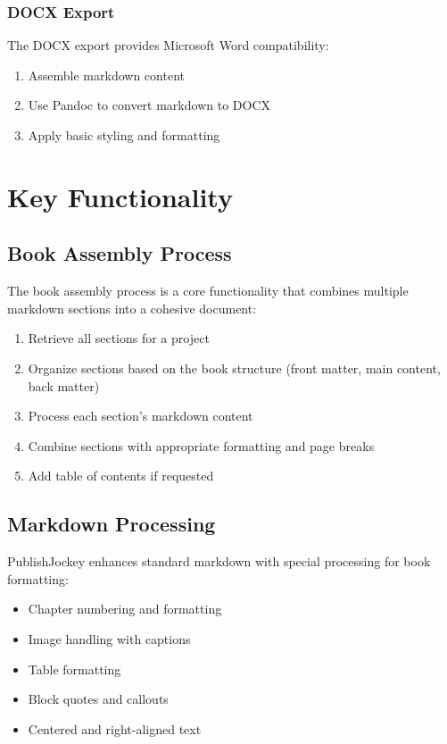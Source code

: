 \documentclass[12pt,a4paper]{book}
\begin{document}
\subsection{DOCX Export}

The DOCX export provides Microsoft Word compatibility:

\begin{enumerate}
  \item Assemble markdown content
  \item Use Pandoc to convert markdown to DOCX
  \item Apply basic styling and formatting
\end{enumerate}

\chapter{Key Functionality}

\section{Book Assembly Process}

The book assembly process is a core functionality that combines multiple markdown sections into a cohesive document:

\begin{enumerate}
  \item Retrieve all sections for a project
  \item Organize sections based on the book structure (front matter, main content, back matter)
  \item Process each section's markdown content
  \item Combine sections with appropriate formatting and page breaks
  \item Add table of contents if requested
\end{enumerate}

\section{Markdown Processing}

PublishJockey enhances standard markdown with special processing for book formatting:

\begin{itemize}
  \item Chapter numbering and formatting
  \item Image handling with captions
  \item Table formatting
  \item Block quotes and callouts
  \item Centered and right-aligned text
\end{itemize}
\end{document}
